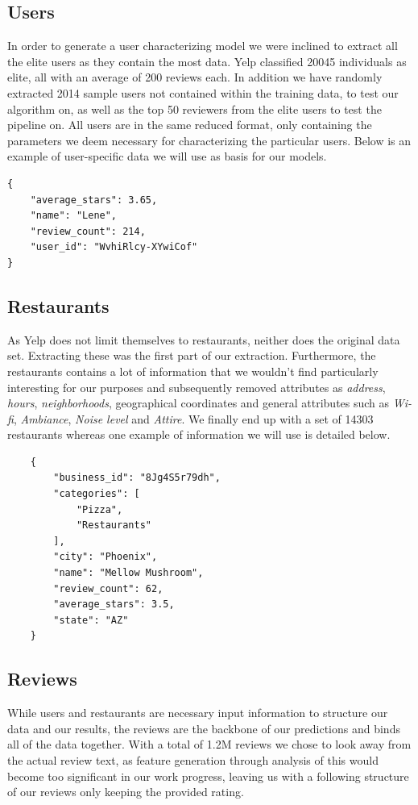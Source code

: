 \documentclass[10pt,twocolumn,letterpaper]{article}
\begin{document}
\subsection{Users}
In order to generate a user characterizing model we were inclined to extract all the elite users as they contain the most data. Yelp classified 20045 individuals as elite, all with an average of 200 reviews each. In addition we have randomly extracted 2014 sample users not contained within the training data, to test our algorithm on, as well as the top 50 reviewers from the elite users to test the pipeline on. All users are in the same reduced format, only containing the parameters we deem necessary for characterizing the particular users. Below is an example of user-specific data we will use as basis for our models.

\begin{verbatim}
{
    "average_stars": 3.65,
    "name": "Lene",
    "review_count": 214,
    "user_id": "WvhiRlcy-XYwiCof"
}
\end{verbatim}

\subsection{Restaurants}
As Yelp does not limit themselves to restaurants, neither does the original data set. Extracting these was the first part of our extraction. Furthermore, the restaurants contains a lot of information that we wouldn't find particularly interesting for our purposes and subsequently removed attributes as \textit{address}, \textit{hours}, \textit{neighborhoods}, geographical coordinates and general attributes such as \textit{Wi-fi}, \textit{Ambiance}, \textit{Noise level} and \textit{Attire}. We finally end up with a set of 14303 restaurants whereas one example of information we will use is detailed below.

\begin{verbatim}
	{
	    "business_id": "8Jg4S5r79dh",
	    "categories": [
	        "Pizza",
	        "Restaurants"
	    ],
	    "city": "Phoenix",
	    "name": "Mellow Mushroom",
	    "review_count": 62,
	    "average_stars": 3.5,
	    "state": "AZ"
	}
\end{verbatim}

\subsection{Reviews}
While users and restaurants are necessary input information to structure our data and our results, the reviews are the backbone of our predictions and binds all of the data together. With a total of 1.2M reviews we chose to look away from the actual review text, as feature generation through analysis of this would become too significant in our work progress, leaving us with a following structure of our reviews only keeping the provided rating.
\end{document}
